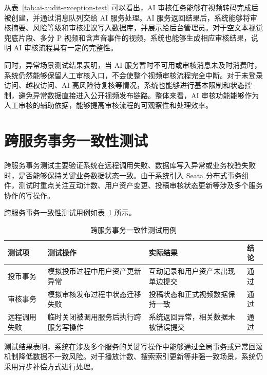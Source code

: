 从表~\ref{tab:ai-audit-exception-test} 可以看出，AI 审核任务能够在视频转码完成后被创建，并通过消息队列交给 AI 服务处理。AI 服务返回结果后，系统能够将审核摘要、风险等级和审核建议写入数据库，并展示给后台管理员。对于空文本视觉兜底片段、多分 P 视频和含声音事件的视频，系统也能够生成相应审核结果，说明 AI 审核流程具有一定的完整性。

同时，异常场景测试结果表明，当 AI 服务暂时不可用或审核消息未及时消费时，系统仍然能够保留人工审核入口，不会使整个视频审核流程完全中断。对于未登录访问、越权访问、AI 高风险待复核等情况，系统也能够进行基本限制和状态控制，避免异常数据直接进入公开视频发布链路。整体来看，AI 审核功能能够作为人工审核的辅助依据，能够提高审核流程的可观察性和处理效率。

\section{跨服务事务一致性测试}
\label{sec:distributed-transaction-test}

跨服务事务测试主要验证系统在远程调用失败、数据库写入异常或业务校验失败时，是否能够保持关键业务数据状态一致。由于系统引入 Seata 分布式事务组件，测试时重点关注互动计数、用户资产变更、投稿审核状态更新等涉及多个服务协作的写操作\cite{seatadocs}。

跨服务事务一致性测试用例如表~\ref{tab:distributed-transaction-test} 所示。

\begin{table}[!htbp]
  \centering
  \caption{跨服务事务一致性测试用例}
  \label{tab:distributed-transaction-test}
  \begin{tabular}{p{}p{}p{}p{}}
    \hline
    \textbf{测试项} & \textbf{测试操作} & \textbf{实际结果} & \textbf{结论} \\
    \hline
    投币事务 & 模拟投币过程中用户资产更新异常 & 互动记录和用户资产未出现单边提交 & 通过 \\
    审核事务 & 模拟审核发布过程中状态迁移失败 & 投稿状态和正式视频数据保持一致 & 通过 \\
    远程调用失败 & 临时关闭被调用服务后执行跨服务写操作 & 系统返回异常，相关数据未被错误提交 & 通过 \\
    \hline
  \end{tabular}
\end{table}

测试结果表明，系统在涉及多个服务的关键写操作中能够通过全局事务或异常回滚机制降低数据不一致风险。对于播放计数、搜索索引更新等非强一致场景，系统仍采用异步补偿方式进行处理。


